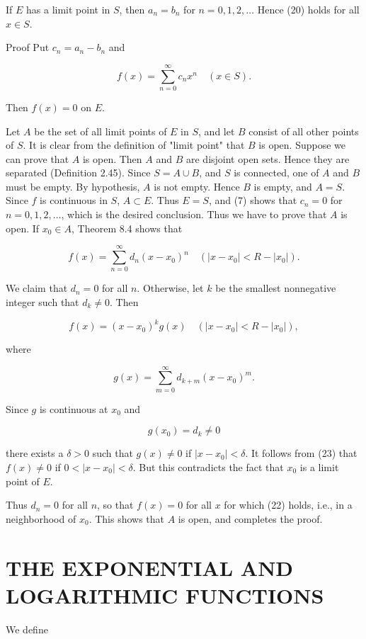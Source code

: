 \documentclass[10pt]{article}
\begin{document}
If $E$ has a limit point in $S$, then $a_{n}=b_{n}$ for $n=0,1,2, \ldots$ Hence (20) holds for all $x \in S$.

Proof Put $c_{n}=a_{n}-b_{n}$ and

$$
f(x)=\sum_{n=0}^{\infty} c_{n} x^{n} \quad(x \in S) .
$$

Then $f(x)=0$ on $E$.

Let $A$ be the set of all limit points of $E$ in $S$, and let $B$ consist of all other points of $S$. It is clear from the definition of "limit point" that $B$ is open. Suppose we can prove that $A$ is open. Then $A$ and $B$ are disjoint open sets. Hence they are separated (Definition 2.45). Since $S=A \cup B$, and $S$ is connected, one of $A$ and $B$ must be empty. By hypothesis, $A$ is not empty. Hence $B$ is empty, and $A=S$. Since $f$ is continuous in $S$, $A \subset E$. Thus $E=S$, and (7) shows that $c_{n}=0$ for $n=0,1,2, \ldots$, which is the desired conclusion. Thus we have to prove that $A$ is open. If $x_{0} \in A$, Theorem 8.4 shows that

$$
f(x)=\sum_{n=0}^{\infty} d_{n}\left(x-x_{0}\right)^{n} \quad\left(\left|x-x_{0}\right|<R-\left|x_{0}\right|\right) .
$$

We claim that $d_{n}=0$ for all $n$. Otherwise, let $k$ be the smallest nonnegative integer such that $d_{k} \neq 0$. Then

$$
f(x)=\left(x-x_{0}\right)^{k} g(x) \quad\left(\left|x-x_{0}\right|<R-\left|x_{0}\right|\right),
$$

where

$$
g(x)=\sum_{m=0}^{\infty} d_{k+m}\left(x-x_{0}\right)^{m} .
$$

Since $g$ is continuous at $x_{0}$ and

$$
g\left(x_{0}\right)=d_{k} \neq 0
$$

there exists a $\delta>0$ such that $g(x) \neq 0$ if $\left|x-x_{0}\right|<\delta$. It follows from (23) that $f(x) \neq 0$ if $0<\left|x-x_{0}\right|<\delta$. But this contradicts the fact that $x_{0}$ is a limit point of $E$.

Thus $d_{n}=0$ for all $n$, so that $f(x)=0$ for all $x$ for which (22) holds, i.e., in a neighborhood of $x_{0}$. This shows that $A$ is open, and completes the proof.

\section{THE EXPONENTIAL AND LOGARITHMIC FUNCTIONS}
We define
\end{document}
